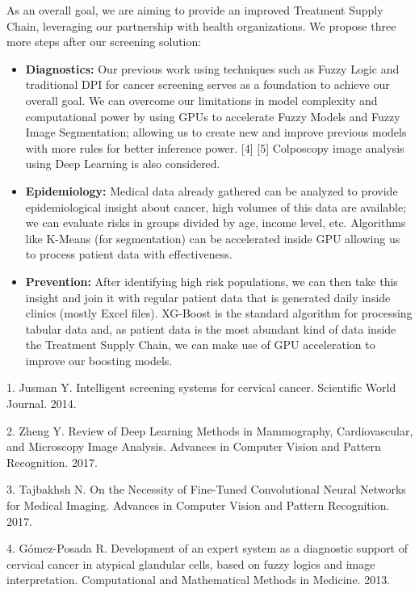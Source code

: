 As an overall goal, we are aiming to provide an improved Treatment Supply Chain,
leveraging our partnership with health organizations. We propose three more
steps after our screening solution:

\begin{itemize}
    \item{\textbf{Diagnostics:}} Our previous work using techniques such as
    Fuzzy Logic and traditional DPI for cancer screening serves as a foundation
    to achieve our overall goal. We can overcome our limitations in model
    complexity and computational power by using GPUs to accelerate Fuzzy Models
    and Fuzzy Image Segmentation; allowing us to create new and improve previous
    models with more rules for better inference power. [4] [5] Colposcopy image
    analysis using Deep Learning is also considered.
    \item{\textbf{Epidemiology:}} Medical data already gathered can be analyzed
    to provide epidemiological insight about cancer, high volumes of this data
    are available; we can evaluate risks in groups divided by age, income level,
    etc. Algorithms like K-Means (for segmentation) can be accelerated inside
    GPU allowing us to process patient data with effectiveness.
    \item{\textbf{Prevention:}} After identifying high risk populations, we can
    then take this insight and join it with regular patient data that is
    generated daily inside clinics (mostly Excel files). XG-Boost is the
    standard algorithm for processing tabular data and, as patient data is the
    most abundant kind of data inside the Treatment Supply Chain, we can make
    use of GPU acceleration to improve our boosting models.
\end{itemize}

1.	Jusman Y. Intelligent screening systems for cervical cancer. Scientific World Journal. 2014.

2.	Zheng Y. Review of Deep Learning Methods in Mammography, Cardiovascular, and Microscopy Image Analysis. Advances in Computer Vision and Pattern Recognition. 2017.

3.	Tajbakhsh N. On the Necessity of Fine-Tuned Convolutional Neural Networks for Medical Imaging. Advances in Computer Vision and Pattern Recognition. 2017.

4.	Gómez-Posada R. Development of an expert system as a diagnostic support of cervical cancer in atypical glandular cells, based on fuzzy logics and image interpretation. Computational and Mathematical Methods in Medicine. 2013.

